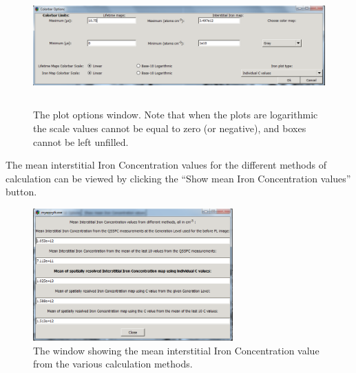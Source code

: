 \documentclass[final,a4paper,oneside,12pt]{article}
\begin{document}
\begin{figure}[h!]
\includegraphics[height=1.8in]{editcolorbar}
\caption{\label{figure2} The plot options window. Note that when the plots are logarithmic the scale values cannot be equal to zero (or negative), and boxes cannot be left unfilled.}
\end{figure}

The mean interstitial Iron Concentration values for the different methods of calculation can be viewed by clicking the ``Show mean Iron Concentration values'' button.

\begin{figure}[h!]
\includegraphics[height=2in]{meanvalues}
\caption{\label{figure2} The window showing the mean interstitial Iron Concentration value from the various calculation methods.}
\end{figure}
\end{document}
